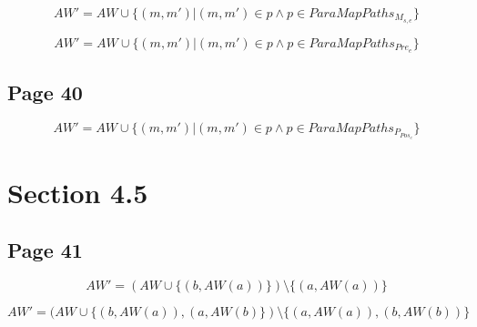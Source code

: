 \[AW' = AW \cup \{(m, m') | (m, m') \in p \land p \in ParaMapPaths_{M_{s,e}}\}\]


\[AW' = AW \cup \{(m, m') | (m, m') \in p \land p \in ParaMapPaths_{Pre_e}\}\]


\subsection*{Page 40}
\[AW' = AW \cup \{(m, m') | (m, m') \in p \land p \in ParaMapPaths_{P_{Pos_e}}\}\]

\section*{Section 4.5}
\subsection*{Page 41}
\[AW' = (AW \cup \{(b, AW(a))\}) \setminus \{(a, AW(a))\}\]

\[AW' = (AW \cup \{(b, AW(a)), (a, AW(b)\}) \setminus \{(a, AW(a)), (b, AW(b))\}\]

